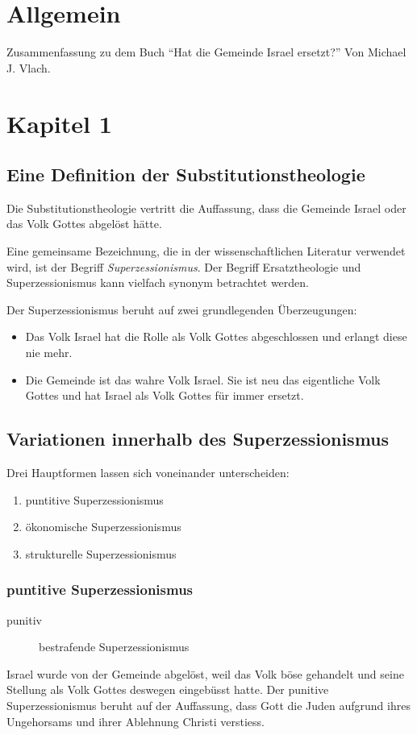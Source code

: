 \documentclass{../../inc/mybib}
\newcommand{\st}{Substitutionstheolog}
\newcommand{\sz}{Superzessionismus}
\begin{document}
    \tableofcontents
    \newpage
    \section{Allgemein}
    Zusammenfassung zu dem Buch \enquote{Hat die Gemeinde Israel ersetzt?} Von Michael J. Vlach.
    \section{Kapitel 1}
    \subsection{Eine Definition der \st{}ie}
    Die Substitutionstheologie vertritt die Auffassung, dass die Gemeinde Israel oder das Volk Gottes abgelöst hätte.

    Eine gemeinsame Bezeichnung, die in der wissenschaftlichen Literatur verwendet wird, ist der Begriff \textit{\sz}. Der Begriff Ersatztheologie und \sz{} kann vielfach synonym betrachtet werden.

    Der \sz{} beruht auf zwei grundlegenden Überzeugungen:
    \begin{itemize}
        \item Das Volk Israel hat die Rolle als Volk Gottes abgeschlossen und erlangt diese nie mehr.
        \item Die Gemeinde ist das wahre Volk Israel. Sie ist neu das eigentliche Volk Gottes und hat Israel als Volk Gottes für immer ersetzt.
    \end{itemize}
    \subsection{Variationen innerhalb des \sz{}}
    Drei Hauptformen lassen sich voneinander unterscheiden:
    \begin{enumerate}
        \item puntitive \sz
        \item ökonomische \sz
        \item strukturelle \sz
    \end{enumerate}
    \subsubsection{puntitive \sz}
    \begin{description}
        \item[punitiv] bestrafende \sz 
    \end{description}
    Israel wurde von der Gemeinde abgelöst, weil das Volk böse gehandelt und seine Stellung als Volk Gottes deswegen eingebüsst hatte.
    Der punitive \sz{} beruht auf der Auffassung, dass Gott die Juden aufgrund ihres Ungehorsams und ihrer Ablehnung Christi verstiess.
    
\end{document}
